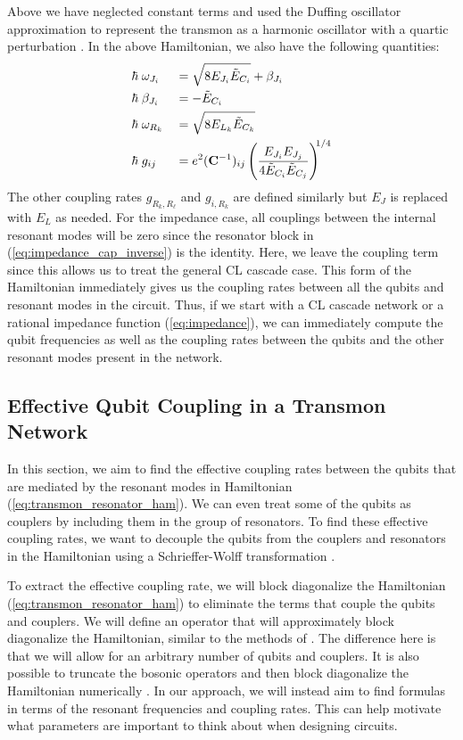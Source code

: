 Above we have neglected constant terms and used the Duffing oscillator approximation to represent the transmon as a harmonic oscillator with a quartic perturbation \cite{transmon}. In the above Hamiltonian, we also have the following quantities:
\begin{alignat}{2}
    &\hbar\;\omega_{J_i} &&= \sqrt{8E_{J_i}\tilde{E}_{C_i}} + \beta_{J_i} \\
    &\hbar\;\beta_{J_i} &&= -\tilde{E}_{C_i} \\
    &\hbar\;\omega_{R_k} &&= \sqrt{8E_{L_k}\tilde{E}_{C_k}} \\
    &\hbar\; g_{ij} &&= e^2 (\vb{C}^{-1})_{ij} \left( \frac{E_{J_i} E_{J_j}}{4 \tilde{E}_{C_i} \tilde{E}_{C_j}  } \right)^{\!\!1/4} \label{eq:node_coupling}
\end{alignat}
The other coupling rates $g_{R_k,R_\ell}$ and $g_{i,R_k}$ are defined similarly but $E_J$ is replaced with $E_L$ as needed. For the impedance case, all couplings between the internal resonant modes will be zero since the resonator block in (\ref{eq:impedance_cap_inverse}) is the identity. Here, we leave the coupling term since this allows us to treat the general CL cascade case. This form of the Hamiltonian immediately gives us the coupling rates between all the qubits and resonant modes in the circuit. Thus, if we start with a CL cascade network or a rational impedance function (\ref{eq:impedance}), we can immediately compute the qubit frequencies as well as the coupling rates between the qubits and the other resonant modes present in the network.

\subsection{Effective Qubit Coupling in a Transmon Network}\label{section:effective_coupling}

In this section, we aim to find the effective coupling rates between the qubits that are mediated by the resonant modes in Hamiltonian (\ref{eq:transmon_resonator_ham}). We can even treat some of the qubits as couplers by including them in the group of resonators. To find these effective coupling rates, we want to decouple the qubits from the couplers and resonators in the Hamiltonian using a Schrieffer-Wolff transformation \cite{bravyi_SW}.

To extract the effective coupling rate, we will block diagonalize the Hamiltonian (\ref{eq:transmon_resonator_ham}) to eliminate the terms that couple the qubits and couplers. We will define an operator that will approximately block diagonalize the Hamiltonian, similar to the methods of \cite{tunable_coupler,tunable_coupler_ext}. The difference here is that we will allow for an arbitrary number of qubits and couplers. It is also possible to truncate the bosonic operators and then block diagonalize the Hamiltonian numerically \cite{bravyi_SW}. In our approach, we will instead aim to find formulas in terms of the resonant frequencies and coupling rates. This can help motivate what parameters are important to think about when designing circuits.

